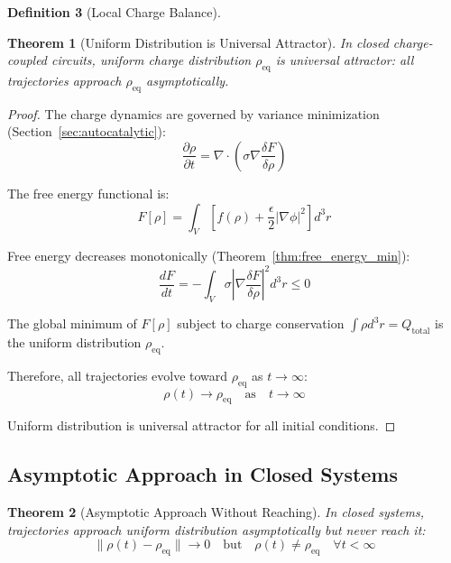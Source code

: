 \documentclass[12pt,a4paper]{article}
\theoremstyle{plain}
\newtheorem{theorem}{Theorem}[section]
\theoremstyle{definition}
\newtheorem{definition}[theorem]{Definition}
\theoremstyle{remark}
\begin{document}
\begin{definition}[Local Charge Balance]
\begin{theorem}[Uniform Distribution is Universal Attractor]
\label{thm:universal_attractor}
In closed charge-coupled circuits, uniform charge distribution $\rho_{\text{eq}}$ is universal attractor: all trajectories approach $\rho_{\text{eq}}$ asymptotically.
\end{theorem}

\begin{proof}
The charge dynamics are governed by variance minimization (Section~\ref{sec:autocatalytic}):
\begin{equation}
\frac{\partial \rho}{\partial t} = \nabla \cdot \left( \sigma \nabla \frac{\delta F}{\delta \rho} \right)
\end{equation}

The free energy functional is:
\begin{equation}
F[\rho] = \int_V \left[ f(\rho) + \frac{\epsilon}{2} |\nabla \phi|^2 \right] d^3r
\end{equation}

Free energy decreases monotonically (Theorem~\ref{thm:free_energy_min}):
\begin{equation}
\frac{dF}{dt} = -\int_V \sigma \left| \nabla \frac{\delta F}{\delta \rho} \right|^2 d^3r \leq 0
\end{equation}

The global minimum of $F[\rho]$ subject to charge conservation $\int \rho d^3r = Q_{\text{total}}$ is the uniform distribution $\rho_{\text{eq}}$.

Therefore, all trajectories evolve toward $\rho_{\text{eq}}$ as $t \to \infty$:
\begin{equation}
\rho(t) \to \rho_{\text{eq}} \quad \text{as} \quad t \to \infty
\end{equation}

Uniform distribution is universal attractor for all initial conditions.
\end{proof}

\subsection{Asymptotic Approach in Closed Systems}

\begin{theorem}[Asymptotic Approach Without Reaching]
\label{thm:asymptotic}
In closed systems, trajectories approach uniform distribution asymptotically but never reach it:
\begin{equation}
\|\rho(t) - \rho_{\text{eq}}\| \to 0 \quad \text{but} \quad \rho(t) \neq \rho_{\text{eq}} \quad \forall t < \infty
\end{equation}
\end{theorem}


\end{definition}
\end{document}
